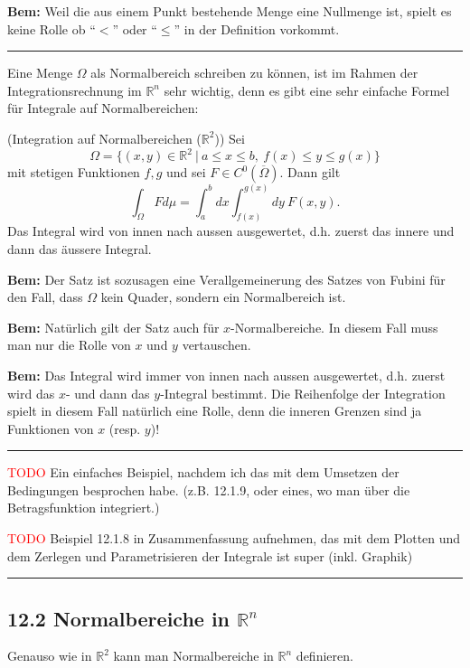 \documentclass[a4paper,landscape,8pt]{extarticle}
\newcommand{\R}{\mathbb{R}}
\newcommand{\setsep}{\ \vert \ }
\newcommand{\todo}{\textcolor{red}{TODO }}
\newcommand{\sep}{\vspace{5pt}\noindent\hrule\vspace{5pt}}
\newcommand{\Bem}{\textbf{Bem: }}
\begin{document}
\begin{multicols*}{4}
\Bem Weil die aus einem Punkt bestehende Menge eine Nullmenge ist, spielt es
keine Rolle ob ``$<$'' oder ``$\leq$'' in der Definition vorkommt.

\sep

Eine Menge $\Omega$ als Normalbereich schreiben zu können, ist im Rahmen der
Integrationsrechnung im $\R^n$ sehr wichtig, denn es gibt eine sehr einfache
Formel für Integrale auf Normalbereichen:

\Satz (Integration auf Normalbereichen ($\R^2$)) Sei
\[
\Omega = \{(x,y)\in\R^2 \setsep a\leq x\leq b, \ f(x)\leq y \leq g(x)\}
\]
mit stetigen Funktionen $f,g$ und sei $F\in{C^0}(\overline{\Omega})$. Dann gilt
\[
\int_\Omega F d\mu = \int_a^b dx\int_{f(x)}^{g(x)} dy \ F(x,y).
\]
Das Integral wird von innen nach aussen ausgewertet, d.h. zuerst das innere und
dann das äussere Integral.

\Bem Der Satz ist sozusagen eine Verallgemeinerung des Satzes von Fubini für den
Fall, dass $\Omega$ kein Quader, sondern ein Normalbereich ist.

\Bem Natürlich gilt der Satz auch für $x$-Normalbereiche. In diesem Fall muss
man nur die Rolle von $x$ und $y$ vertauschen.

\Bem Das Integral wird immer von innen nach aussen ausgewertet, d.h. zuerst
wird das $x$- und dann das $y$-Integral bestimmt. Die Reihenfolge der
Integration spielt in diesem Fall natürlich eine Rolle, denn die inneren Grenzen
sind ja Funktionen von $x$ (resp. $y$)!

\begin{warmup}

\sep

\Bsp 

\todo Ein einfaches Beispiel, nachdem ich das mit dem Umsetzen der Bedingungen
besprochen habe. (z.B. 12.1.9, oder eines, wo man über die Betragsfunktion
integriert.)

\todo Beispiel 12.1.8 in Zusammenfassung aufnehmen, das mit dem Plotten und dem
Zerlegen und Parametrisieren der Integrale ist super (inkl. Graphik)


\sep

\end{warmup}

\subsection{12.2 Normalbereiche in $\R^n$}

Genauso wie in $\R^2$ kann man Normalbereiche in $\R^n$ definieren.


\end{multicols*}
\end{document}

